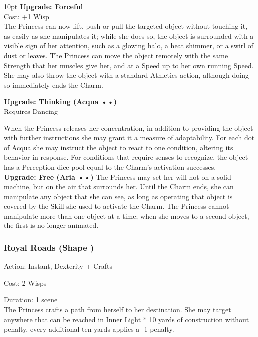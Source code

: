 \begin{myindentpar}{10pt}
\textbf{Upgrade: Forceful}\\
Cost: +1 Wisp\\

The Princess can now lift, push or pull the targeted object without touching it, as easily
as she manipulates it; while she does so, the object is surrounded with a visible sign of her
attention, such as a glowing halo, a heat shimmer, or a swirl of dust or leaves. The Princess can
move the object remotely with the same Strength that her muscles give her, and at a Speed
up to her own running Speed. She may also throw the object with a standard Athletics action,
although doing so immediately ends the Charm.

\textbf{Upgrade: Thinking (Acqua ••)}\\
Requires Dancing

When the Princess releases her concentration, in addition to providing the object with
further instructions she may grant it a measure of adaptability. For each dot of Acqua she may
instruct the object to react to one condition, altering its behavior in response. For conditions
that require senses to recognize, the object has a Perception dice pool equal to the Charm’s
activation successes.\\

\textbf{Upgrade: Free (Aria ••)}
The Princess may set her will not on a solid machine, but on the air that surrounds her.
Until the Charm ends, she can manipulate any object that she can see, as long as operating that
object is covered by the Skill she used to activate the Charm. The Princess cannot manipulate
more than one object at a time; when she moves to a second object, the first is no longer
animated.

\end{myindentpar}
\subsubsection*{Royal Roads (Shape \textbullet\textbullet)}
\noindent Action: Instant, Dexterity + Crafts

\noindent Cost: 2 Wisps

\noindent Duration: 1 scene\\

The Princess crafts a path from herself to her destination. She may target anywhere that can be reached in Inner Light * 10 yards of construction without penalty, every additional ten yards applies a -1 penalty.

